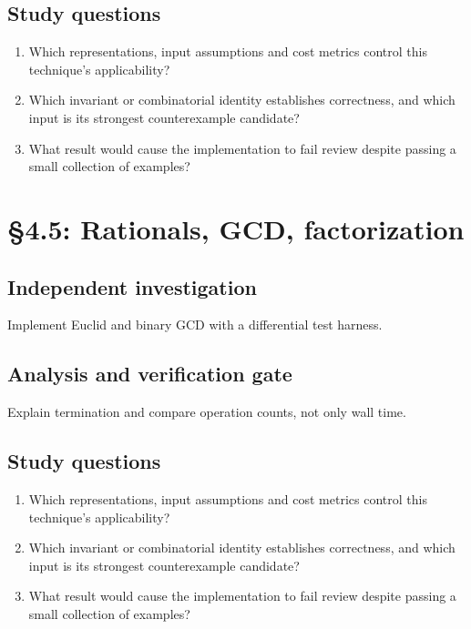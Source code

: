 \documentclass[11pt,letterpaper]{article}
\begin{document}
\subsection{Study questions}
\begin{enumerate}
\item Which representations, input assumptions and cost metrics control this technique's applicability?
\item Which invariant or combinatorial identity establishes correctness, and which input is its strongest counterexample candidate?
\item What result would cause the implementation to fail review despite passing a small collection of examples?
\end{enumerate}

\section{\S 4.5: Rationals, GCD, factorization}
\subsection{Independent investigation}
Implement Euclid and binary GCD with a differential test harness.
\subsection{Analysis and verification gate}
Explain termination and compare operation counts, not only wall time.
\subsection{Study questions}
\begin{enumerate}
\item Which representations, input assumptions and cost metrics control this technique's applicability?
\item Which invariant or combinatorial identity establishes correctness, and which input is its strongest counterexample candidate?
\item What result would cause the implementation to fail review despite passing a small collection of examples?
\end{enumerate}
\end{document}
